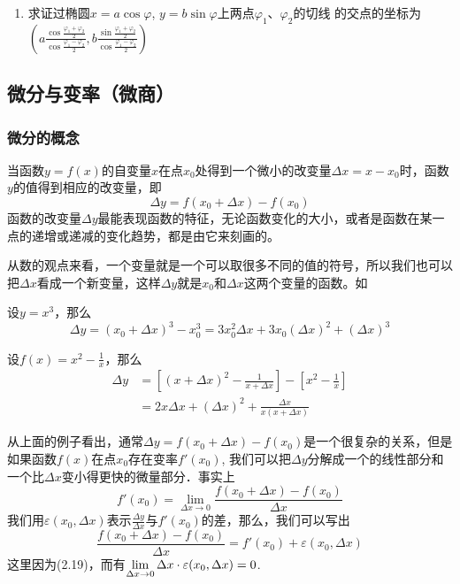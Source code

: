 \begin{ex}
\begin{enumerate}
\item 求证过椭圆$x=a\cos\varphi$, $y=b\sin\varphi$上两点$\varphi_1$、$\varphi_2$的切线
的交点的坐标为
$\left(a\frac{\cos\frac{\varphi_1+\varphi_2}{2}}{\cos\frac{\varphi_1-\varphi_2}{2}}, b\frac{\sin\frac{\varphi_1+\varphi_2}{2}}{\cos\frac{\varphi_1-\varphi_2}{2}}\right)$
\end{enumerate}
\end{ex}

\subsection{微分与变率（微商）}

\subsubsection{微分的概念}

当函数$y=f(x)$的自变量$x$在点$x_0$处得到一个微小的改变量$\Delta x=x-x_0$时，函数$y$的值得到相应的改变量，即
\begin{equation}
    \Delta y=f (x_0+\Delta x) -f (x_0) 
\end{equation} 
函数的改变量$\Delta y$最能表现函数的特征，无论函数变化的大小，或者是函数在某一点的递增或递减的变化趋势，都是由它来刻画的。

从数的观点来看，一个变量就是一个可以取很多不同的值的符号，所以我们也可以把$\Delta x$看成一个新变量，这样$\Delta y$就是$x_0$和$\Delta x$这两个变量的函数。如

\begin{example}
    设$y=x^3$，那么
\[\Delta y=(x_0+\Delta x)^3-x^3_0 =3x_0^2\Delta x+3x_0(\Delta x)^2+(\Delta x)^3\]
\end{example}

\begin{example}
    设$f(x)=x^2-\frac{1}{x}$，那么
\[\begin{split}
    \Delta y&=\left[(x+\Delta x)^2-\frac{1}{x+\Delta x}\right]-\left[x^2-\frac{1}{x}\right]\\
    &=2x\Delta x+(\Delta x)^2+\frac{\Delta x}{x(x+\Delta x)}
\end{split}\] 
\end{example}

从上面的例子看出，通常$\Delta y=f(x_0+\Delta x)-f(x_0)$是一个很复杂的关系，但是如果函数$f(x)$在点$x_0$存在变率$f'(x_0)$, 我们可以把$\Delta y$分解成一个的线性部分和一个比$\Delta x$变小得更快的微量部分．事实上
\begin{equation}
 f'(x_0)=\lim_{\Delta x\to 0}\frac{f(x_0+\Delta x)-f(x_0)}{\Delta x}
\end{equation}
我们用$\varepsilon(x_0,\Delta x)$表示$\frac{\Delta 
y}{\Delta x}$与$f'(x_0)$的差，那么，我们可以写出
\begin{equation}
\frac{f(x_0+\Delta x)-f(x_0)}{\Delta x}=f'(x_0)+\varepsilon(x_0,\Delta x)
\end{equation}
这里因为(2.19)，而有$\displaystyle\lim_{\Delta x\to 0}\Delta x \cdot \varepsilon(x_0,\Delta x)=0$.

